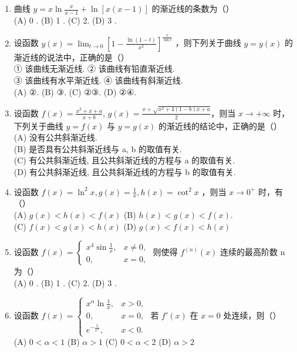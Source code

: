 \documentclass[12pt, a4paper]{ctexart}
\begin{document}
\begin{enumerate}
    \item 曲线 $ y = x \ln \frac{x}{x-1} + \ln \left[ x(x-1) \right] $ 的渐近线的条数为（）\\
    (A) 0 . \quad (B) 1 . \quad (C) 2. \quad (D) 3 .

    \item 设函数 $ y(x)=\lim_{t\to0}\left[1-\frac{\ln(1-t)}{x^{2}}\right]^{\frac{x}{\sin t}} $ ，则下列关于曲线 $ y=y(x) $ 的渐近线的说法中，正确的是（）\\
    ① 该曲线无渐近线. ② 该曲线有铅直渐近线.\\
    ③ 该曲线有水平渐近线. ④ 该曲线有斜渐近线.\\
    (A) ②. \quad (B) ③. \quad (C) ②③. \quad (D) ②④.

    \item 设函数 $ f(x)=\frac{x^{2}+x+a}{x+b} $, $ g(x)=\frac{x+\sqrt{x^{2}+4(1-b)x+a}}{2} $，则当 $ x\to+\infty $ 时，下列关于曲线 $ y=f(x) $ 与 $ y=g(x) $ 的渐近线的结论中，正确的是（）\\
    (A) 没有公共斜渐近线.\\
    (B) 是否具有公共斜渐近线与 a, b 的取值有关.\\
    (C) 有公共斜渐近线, 且公共斜渐近线的方程与 a 的取值有关.\\
    (D) 有公共斜渐近线, 且公共斜渐近线的方程与 b 的取值有关.

    \item 设函数 $ f(x)=\ln^{2}x, g(x)=\frac{1}{x}, h(x)=\cot^{2}x $ ，则当 $ x \to 0^{+} $ 时，有（）\\
    (A) $ g(x) < h(x) < f(x) $ \quad (B) $ h(x) < g(x) < f(x) $.\\
    (C) $ f(x) < g(x) < h(x) $ \quad (D) $ g(x) < f(x) < h(x) $

    \item 设函数 $ f(x) = \begin{cases} x^{4} \sin \frac{1}{x}, & x \neq 0, \\ 0, & x = 0, \end{cases} $ 则使得 $ f^{(n)}(x) $ 连续的最高阶数 n 为（）\\
    (A) 0 . \quad (B) 1 . \quad (C) 2. \quad (D) 3 .

    \item 设函数 $ f(x) = \begin{cases} x^{\alpha} \ln \frac{1}{x}, & x > 0, \\ 0, & x = 0, \\ e^{-\frac{1}{x^2}}, & x < 0. \end{cases} $ 若 $ f'(x) $ 在 $ x = 0 $ 处连续，则（）\\
    (A) $ 0 < \alpha < 1 $ \quad (B) $ \alpha > 1 $ \quad (C) $ 0 < \alpha < 2 $ \quad (D) $ \alpha > 2 $


\end{enumerate}
\end{document}
